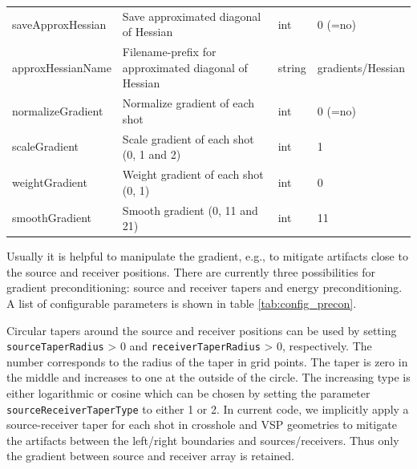\documentclass[pdftex,a4paper,parskip,listof=totoc,bibliography=totoc,onehalfspacing,12pt]{scrreprt}
\begin{document}
\begin{table}[h!]
\begin{adjustbox}{width=1\textwidth,center=\textwidth}
\begin{tabular}{llll}
         saveApproxHessian        & Save approximated diagonal of Hessian                               &  int   & 0 (=no) \\
         approxHessianName        & Filename-prefix for approximated diagonal of Hessian                   & string & gradients/Hessian \\
         normalizeGradient        & Normalize gradient of each shot                                     &  int   & 0 (=no) \\
         scaleGradient        & Scale gradient of each shot (0, 1 and 2)                                     &  int   & 1 \\
         weightGradient        & Weight gradient of each shot (0, 1)                                    &  int   & 0 \\
         smoothGradient        & Smooth gradient (0, 11 and 21)                                     &  int   & 11 \\
	\bottomrule
	\end{tabular}
	\end{adjustbox}
\end{table}
Usually it is helpful to manipulate the gradient, e.g., to mitigate artifacts close to the source and receiver positions. There are currently three possibilities for gradient preconditioning: source and receiver tapers and energy preconditioning. A list of configurable parameters is shown in table \ref{tab:config_precon}.

Circular tapers around the source and receiver positions can be used by setting \verb+sourceTaperRadius+ > 0 and \verb+receiverTaperRadius+ > 0, respectively. The number corresponds to the radius of the taper in grid points. The taper is zero in the middle and increases to one at the outside of the circle. The increasing type is either logarithmic or cosine which can be chosen by setting the parameter \verb+sourceReceiverTaperType+ to either 1 or 2. In current code, we implicitly apply a source-receiver taper for each shot in crosshole and VSP geometries to mitigate the artifacts between the left/right boundaries and sources/receivers. Thus only the gradient between source and receiver array is retained.
\end{document}
